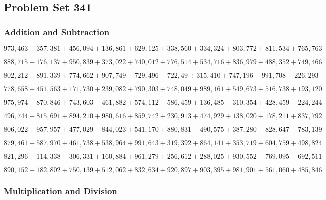 \hypertarget{problem-set-341}{%
\subsection{Problem Set 341}\label{problem-set-341}}

\hypertarget{addition-and-subtraction}{%
\subsubsection{Addition and
Subtraction}\label{addition-and-subtraction}}

\(973,463+357,381+456,094+136,861+629,125+338,560+334,324+803,772+811,534+765,763\)

\(888,715+176,137+950,839+373,022+740,012+776,514+534,716+836,979+488,352+749,466\)

\(802,212+891,339+774,662+907,749-729,496-722,49÷315,410+747,196-991,708+226,293\)

\(778,658+451,563+171,730+239,082+790,303+748,049+989,161+549,673+516,738+193,120\)

\(975,974+870,846+743,603-461,882+574,112-586,459+136,485-310,354+428,459-224,244\)

\(496,744+815,691+894,210+980,616+859,742+230,913+474,929+138,020+178,211+837,792\)

\(806,022+957,957+477,029-844,023+541,170+880,831-490,575+387,280-828,647-783,139\)

\(879,461+587,970+461,738+538,964+991,643+319,392+864,141+353,719+604,759+498,824\)

\(821,296-114,338-306,331+160,884+961,279+256,612+288,025+930,552-769,095-692,511\)

\(890,152+182,802+750,139+512,062+832,634+920,897+903,395+981,901+561,060+485,846\)

\hypertarget{multiplication-and-division}{%
\subsubsection{Multiplication and
Division}\label{multiplication-and-division}}

